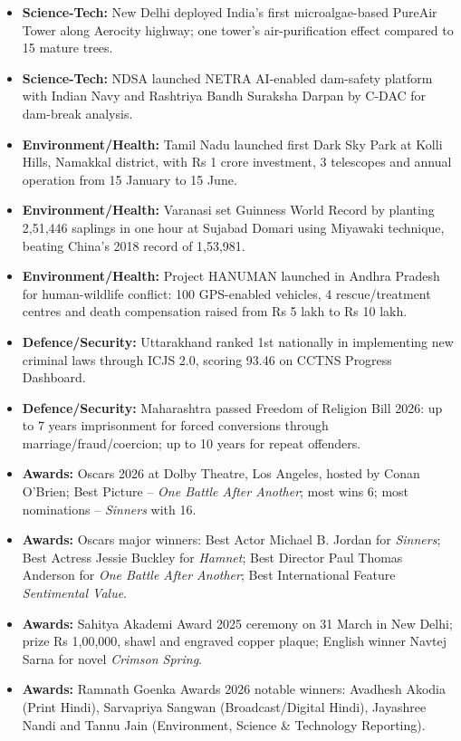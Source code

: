 \documentclass[10pt,a4paper]{article}
\begin{document}
\begin{itemize}
    \item \textbf{Science-Tech:} New Delhi deployed India's first microalgae-based PureAir Tower along Aerocity highway; one tower's air-purification effect compared to 15 mature trees.
    \item \textbf{Science-Tech:} NDSA launched NETRA AI-enabled dam-safety platform with Indian Navy and Rashtriya Bandh Suraksha Darpan by C-DAC for dam-break analysis.
    \item \textbf{Environment/Health:} Tamil Nadu launched first Dark Sky Park at Kolli Hills, Namakkal district, with Rs 1 crore investment, 3 telescopes and annual operation from 15 January to 15 June.
    \item \textbf{Environment/Health:} Varanasi set Guinness World Record by planting 2,51,446 saplings in one hour at Sujabad Domari using Miyawaki technique, beating China's 2018 record of 1,53,981.
    \item \textbf{Environment/Health:} Project HANUMAN launched in Andhra Pradesh for human-wildlife conflict: 100 GPS-enabled vehicles, 4 rescue/treatment centres and death compensation raised from Rs 5 lakh to Rs 10 lakh.
    \item \textbf{Defence/Security:} Uttarakhand ranked 1st nationally in implementing new criminal laws through ICJS 2.0, scoring 93.46 on CCTNS Progress Dashboard.
    \item \textbf{Defence/Security:} Maharashtra passed Freedom of Religion Bill 2026: up to 7 years imprisonment for forced conversions through marriage/fraud/coercion; up to 10 years for repeat offenders.
    \item \textbf{Awards:} Oscars 2026 at Dolby Theatre, Los Angeles, hosted by Conan O'Brien; Best Picture -- \textit{One Battle After Another}; most wins 6; most nominations -- \textit{Sinners} with 16.
    \item \textbf{Awards:} Oscars major winners: Best Actor Michael B. Jordan for \textit{Sinners}; Best Actress Jessie Buckley for \textit{Hamnet}; Best Director Paul Thomas Anderson for \textit{One Battle After Another}; Best International Feature \textit{Sentimental Value}.
    \item \textbf{Awards:} Sahitya Akademi Award 2025 ceremony on 31 March in New Delhi; prize Rs 1,00,000, shawl and engraved copper plaque; English winner Navtej Sarna for novel \textit{Crimson Spring}.
    \item \textbf{Awards:} Ramnath Goenka Awards 2026 notable winners: Avadhesh Akodia (Print Hindi), Sarvapriya Sangwan (Broadcast/Digital Hindi), Jayashree Nandi and Tannu Jain (Environment, Science \& Technology Reporting).

\end{itemize}
\end{document}
